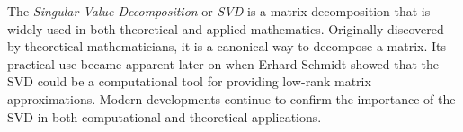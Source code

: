 
\label{lab:SVD}
%


The \emph{Singular Value Decomposition} or \emph{SVD} is a matrix decomposition that is widely used in both theoretical and applied mathematics. 
Originally discovered by theoretical mathematicians, it is a canonical way to decompose a matrix.
Its practical use became apparent later on when Erhard Schmidt showed that the SVD could be a computational tool for providing low-rank matrix approximations.
Modern developments continue to confirm the importance of the SVD in both computational and theoretical applications.

